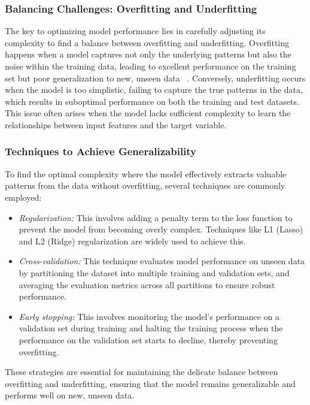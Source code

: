 \subsubsection{Balancing Challenges: Overfitting and Underfitting}
\label{sub2:overfitting}
The key to optimizing model performance lies in carefully adjusting its complexity to find a balance between overfitting
and underfitting. Overfitting happens when a model captures not only the underlying patterns but also the noise within the
training data, leading to excellent performance on the training set but poor generalization to new, unseen data
~\cite{zhang_overfitting_2019,sullivanUnderstandingMachineLearning2022}. Conversely, underfitting occurs when the model is
too simplistic, failing to capture the true patterns in the data, which results in suboptimal performance on both the training
and test datasets. This issue often arises when the model lacks sufficient complexity to learn the relationships between input
features and the target variable.

\subsubsection{Techniques to Achieve Generalizability}
To find the optimal complexity where the model effectively extracts valuable patterns from the data without overfitting, several techniques are commonly employed:

\begin{itemize}
    \item \emph{Regularization:} This involves adding a penalty term to the loss function to prevent the model from becoming overly complex.
          Techniques like L1 (Lasso) and L2 (Ridge) regularization are widely used to achieve this.
    \item \emph{Cross-validation:} This technique evaluates model performance on unseen data by partitioning the dataset into multiple training
          and validation sets, and averaging the evaluation metrics across all partitions to ensure robust performance.
    \item \emph{Early stopping:} This involves monitoring the model's performance on a validation set during training and halting the training
          process when the performance on the validation set starts to decline, thereby preventing overfitting.
\end{itemize}

These strategies are essential for maintaining the delicate balance between overfitting and underfitting, ensuring that the model remains
generalizable and performs well on new, unseen data\cite{medium_ml_overfitting_2023}.
